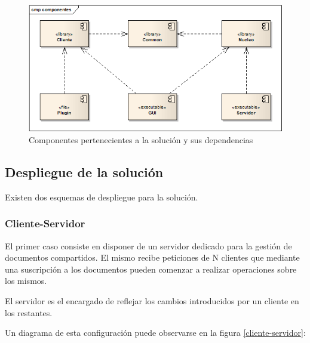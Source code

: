 \documentclass[12pt,a4paper]{article}
\begin{document}
	\begin{figure}[!ht]
		\begin{center}
			\includegraphics[width=13cm]{componentes.png}
			\caption{\label{componentes} Componentes pertenecientes a la solución y sus dependencias }
		\end{center}
	\end{figure}

\subsection{Despliegue de la solución}
Existen dos esquemas de despliegue para la solución.

\subsubsection{Cliente-Servidor}
El primer caso consiste en disponer de un servidor dedicado para la gestión de documentos compartidos. El mismo recibe
peticiones de N clientes que mediante una suscripción a los documentos pueden comenzar a realizar operaciones sobre los mismos.

El servidor es el encargado de reflejar los cambios introducidos por un cliente en los restantes.

Un diagrama de esta configuración puede observarse en la figura \ref{cliente-servidor}:
\end{document}
